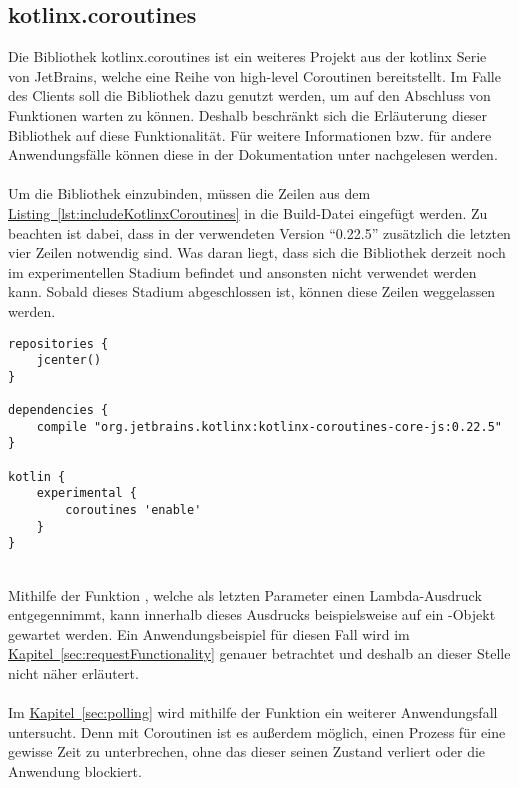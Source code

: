 \subsection{kotlinx.coroutines}\label{sec:kotlinxCoroutines}
Die Bibliothek kotlinx.coroutines \cite{kotlinxCoroutines} ist ein weiteres Projekt aus der kotlinx Serie von JetBrains, welche eine Reihe von high-level Coroutinen bereitstellt. Im Falle des Clients soll die Bibliothek dazu genutzt werden, um auf den Abschluss von Funktionen warten zu können. Deshalb beschränkt sich die Erläuterung dieser Bibliothek auf diese Funktionalität. Für weitere Informationen bzw. für andere Anwendungsfälle können diese in der Dokumentation unter \cite{kotlinxCoroutinesDocu} nachgelesen werden.\\
\\
Um die Bibliothek einzubinden, müssen die Zeilen aus dem \hyperref[lst:includeKotlinxCoroutines]{Listing~\ref{lst:includeKotlinxCoroutines}} in die Build-Datei eingefügt werden. Zu beachten ist dabei, dass in der verwendeten Version \enquote{0.22.5} zusätzlich die letzten vier Zeilen notwendig sind. Was daran liegt, dass sich die Bibliothek derzeit noch im experimentellen Stadium befindet und ansonsten nicht verwendet werden kann. Sobald dieses Stadium abgeschlossen ist, können diese Zeilen weggelassen werden.
\\
\begin{lstlisting}[style=lstStyleFramed, language=Gradle, caption={Einbindung der Bibliothek kotlinx.coroutines mittels Gradle}, label=lst:includeKotlinxCoroutines, float]
repositories {
	jcenter()
}

dependencies {
	compile "org.jetbrains.kotlinx:kotlinx-coroutines-core-js:0.22.5"
}

kotlin {
	experimental {
		coroutines 'enable'
	}
}
\end{lstlisting}
\\
Mithilfe der Funktion , welche als letzten Parameter einen Lambda-Ausdruck entgegennimmt, kann innerhalb dieses Ausdrucks beispielsweise auf ein -Objekt gewartet werden. Ein Anwendungsbeispiel für diesen Fall wird im \hyperref[sec:requestFunctionality]{Kapitel~\ref{sec:requestFunctionality}} genauer betrachtet und deshalb an dieser Stelle nicht näher erläutert.\\
\\
Im \hyperref[sec:polling]{Kapitel~\ref{sec:polling}} wird mithilfe der Funktion  ein weiterer Anwendungsfall untersucht. Denn mit Coroutinen ist es außerdem möglich, einen Prozess für eine gewisse Zeit zu unterbrechen, ohne das dieser seinen Zustand verliert oder die Anwendung blockiert.

